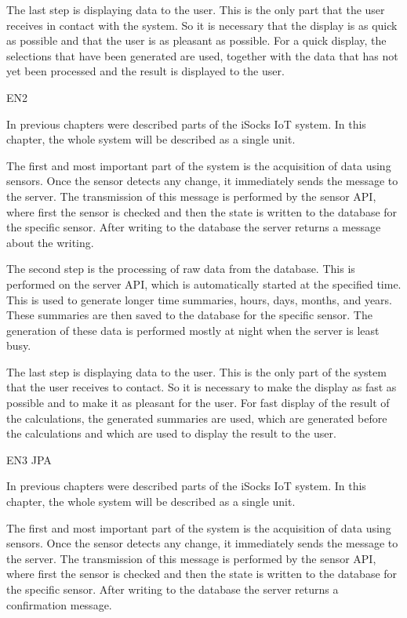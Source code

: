 \documentclass[12pt, a4paper]{article}
\begin{document}
The last step is displaying data to the user.
This is the only part that the user receives in contact with the system.
So it is necessary that the display is as quick as possible and that the user is as pleasant as possible.
For a quick display, the selections that have been generated are used, together with the data that has not yet been processed and the result is displayed to the user.

EN2

In previous chapters were described parts of the iSocks IoT system.
In this chapter, the whole system will be described as a single unit.

The first and most important part of the system is the acquisition of data using sensors.
Once the sensor detects any change, it immediately sends the message to the server.
The transmission of this message is performed by the sensor API, where first the sensor is checked and then the state is written to the database for the specific sensor.
After writing to the database the server returns a message about the writing.

The second step is the processing of raw data from the database.
This is performed on the server API, which is automatically started at the specified time.
This is used to generate longer time summaries, hours, days, months, and years.
These summaries are then saved to the database for the specific sensor.
The generation of these data is performed mostly at night when the server is least busy.

The last step is displaying data to the user.
This is the only part of the system that the user receives to contact.
So it is necessary to make the display as fast as possible and to make it as pleasant for the user.
For fast display of the result of the calculations, the generated summaries are used, which are generated before the calculations and which are used to display the result to the user.

EN3 JPA

In previous chapters were described parts of the iSocks IoT system.
In this chapter, the whole system will be described as a single unit.

The first and most important part of the system is the acquisition of data using sensors.
Once the sensor detects any change, it immediately sends the message to the server.
The transmission of this message is performed by the sensor API, where first the sensor is checked and then the state is written to the database for the specific sensor.
After writing to the database the server returns a confirmation message.
\end{document}
